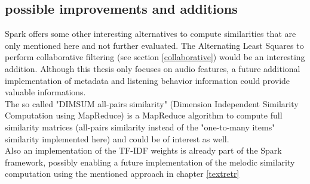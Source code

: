 \subsection{possible improvements and additions}

Spark offers some other interesting alternatives to compute similarities that are only mentioned here and not further evaluated.  
The Alternating Least Squares to perform collaborative filtering (see section \ref{collaborative}) would be an interesting addition. Although this thesis only focuses on audio features, a future additional implementation of metadata and listening behavior information could provide valuable informations.\\ 
The so called "DIMSUM all-pairs similarity" (Dimension Independent Similarity Computation using MapReduce) is a MapReduce algorithm to compute full similarity matrices (all-pairs similarity instead of the "one-to-many items" similarity implemented here) and could be of interest as well.\\
Also an implementation of the TF-IDF weights is already part of the Spark framework, possibly enabling a future implementation of the melodic similarity computation using the mentioned approach in chapter \ref{textretr}
